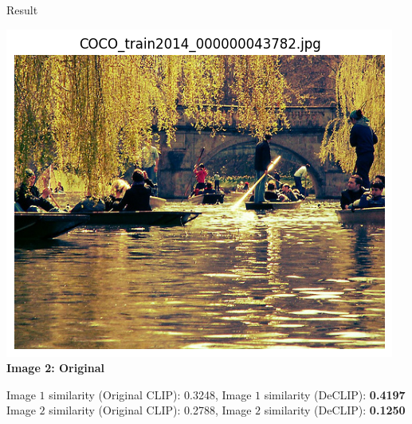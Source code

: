 \documentclass[final]{beamer}
\begin{document}
\begin{frame}[t]
\begin{columns}[t]
\begin{column}{0.3\textwidth}
\begin{block}{Result}
\begin{minipage}[t]{0.4\linewidth}
        \centering
        \includegraphics[width=\linewidth]{poster/assets/pic2.png}
        \vspace{0.3em}
        \small\textbf{Image 2: Original} 
    \end{minipage}

Image $1$ similarity (Original CLIP): 0.3248,
Image $1$ similarity (DeCLIP): \textbf{0.4197}\\
Image $2$ similarity (Original CLIP): 0.2788,
Image $2$ similarity (DeCLIP): \textbf{0.1250}\\
\end{block}

    
  

\end{column}
\end{columns}
\end{frame}
\end{document}
